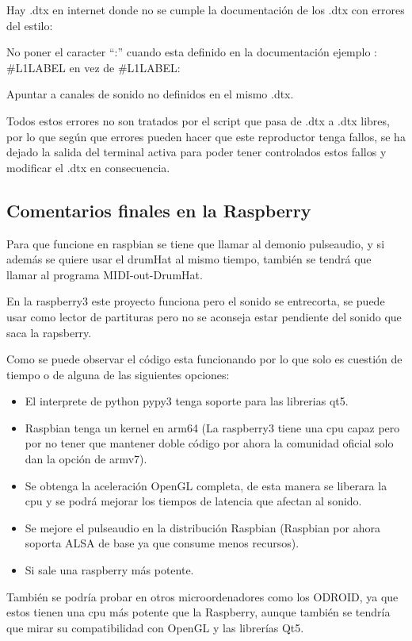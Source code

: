 \documentclass[a4paper,11pt,oneside]{book}
\begin{document}
Hay .dtx en internet donde no se cumple la documentación de los .dtx con errores del estilo:

No poner el caracter ``:'' cuando esta definido en la documentación ejemplo : \#L1LABEL en vez de \#L1LABEL:

Apuntar a canales de sonido no definidos en el mismo .dtx.

Todos estos errores no son tratados por el script que pasa de .dtx a .dtx libres, por lo que según que errores pueden hacer que este reproductor tenga fallos, se ha dejado la salida del terminal activa para poder tener controlados estos fallos y modificar el .dtx en consecuencia.

\subsection{Comentarios finales en la Raspberry}

Para que funcione en raspbian se tiene que llamar al demonio pulseaudio, y si además se quiere usar el drumHat al mismo tiempo, también se tendrá que llamar al programa MIDI-out-DrumHat.

En la raspberry3 este proyecto funciona pero el sonido se entrecorta, se puede usar como lector de partituras pero no se aconseja estar pendiente del sonido que saca la rapsberry.

Como se puede observar el código esta funcionando por lo que solo es cuestión de tiempo o de alguna de las siguientes opciones:
\begin{itemize}
  \item El interprete de python pypy3 tenga soporte para las librerias qt5.
  \item Raspbian tenga un kernel en arm64 (La raspberry3 tiene una cpu capaz pero por no tener que mantener doble código por ahora la comunidad oficial solo dan la opción de armv7).
  \item Se obtenga la aceleración OpenGL completa, de esta manera se liberara la cpu y se podrá mejorar los tiempos de latencia que afectan al sonido.
  \item Se mejore el pulseaudio en la distribución Raspbian (Raspbian por ahora soporta ALSA de base ya que consume menos recursos).
  \item Si sale una raspberry más potente.
\end{itemize}

También se podría probar en otros microordenadores como los ODROID, ya que estos tienen una cpu más potente que la Raspberry, aunque también se tendría que mirar su compatibilidad con OpenGL y las librerías Qt5.
\end{document}
